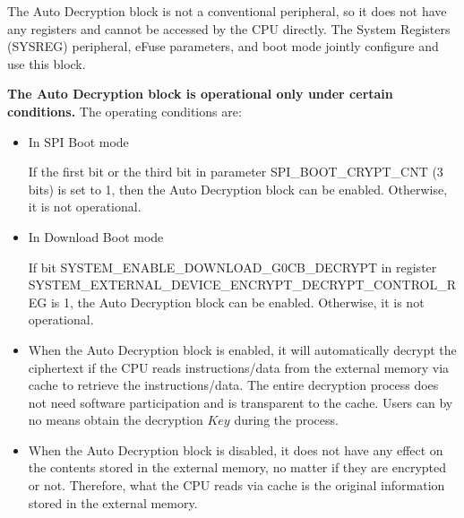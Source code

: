 \documentclass[main\_\_EN.tex]{subfiles}
\begin{document}
The Auto Decryption block is not a conventional peripheral, so it does not have any registers and cannot be accessed by the CPU directly. The System Registers (SYSREG) peripheral, eFuse parameters, and boot mode jointly configure and use this block.

\textbf{The Auto Decryption block is operational only under certain conditions.} The operating conditions are:

\begin{itemize}
    
    \item In SPI Boot mode
    
    If the first bit or the third bit in parameter SPI\_BOOT\_CRYPT\_CNT (3 bits) is set to 1, then the Auto Decryption block can be enabled. Otherwise, it is not operational.
    
    \item In Download Boot mode
    
    If bit SYSTEM\_ENABLE\_DOWNLOAD\_G0CB\_DECRYPT in register\\ SYSTEM\_EXTERNAL\_DEVICE\_ENCRYPT\_DECRYPT\_CONTROL\_REG is 1, the Auto Decryption block can be enabled. Otherwise, it is not operational.
    
\end{itemize}

\begin{tiplisting}
\vspace{-2em}
\begin{itemize}

\item When the Auto Decryption block is enabled, it will automatically decrypt the ciphertext if the CPU reads instructions/data from the external memory via cache to retrieve the instructions/data. The entire decryption process does not need software participation and is transparent to the cache. Users can by no means obtain the decryption \begin{math}Key\end{math} during the process.

\item When the Auto Decryption block is disabled, it does not have any effect on the contents stored in the external memory, no matter if they are encrypted or not. Therefore, what the CPU reads via cache is the original information stored in the external memory.

\end{itemize}
\end{tiplisting}
\end{document}
